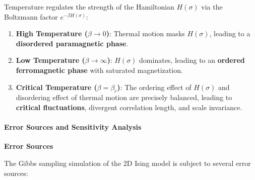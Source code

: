 \documentclass[11pt]{article}
\providecommand{\tightlist}{%
      \setlength{\itemsep}{0pt}\setlength{\parskip}{0pt}}
\begin{document}
Temperature regulates the strength of the Hamiltonian \(H(\sigma)\) via
the Boltzmann factor \(e^{-\beta H(\sigma)}\):

\begin{enumerate}
\def\labelenumi{\arabic{enumi}.}
\tightlist
\item
  \textbf{High Temperature (\(\beta \to 0\))}: Thermal motion masks
  \(H(\sigma)\), leading to a \textbf{disordered paramagnetic phase}.
\item
  \textbf{Low Temperature (\(\beta \to \infty\))}: \(H(\sigma)\)
  dominates, leading to an \textbf{ordered ferromagnetic phase} with
  saturated magnetization.
\item
  \textbf{Critical Temperature (\(\beta = \beta_c\))}: The ordering
  effect of \(H(\sigma)\) and disordering effect of thermal motion are
  precisely balanced, leading to \textbf{critical fluctuations},
  divergent correlation length, and scale invariance.
\end{enumerate}

    \paragraph{Error Sources and Sensitivity
Analysis}\label{error-sources-and-sensitivity-analysis}

\textbf{Error Sources}

The Gibbs sampling simulation of the 2D Ising model is subject to
several error sources:
\end{document}
